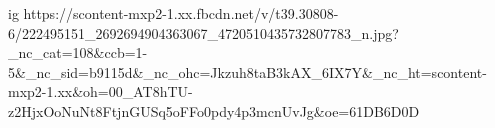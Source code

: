  
 
 
 
 

\ifcmt
  ig https://scontent-mxp2-1.xx.fbcdn.net/v/t39.30808-6/222495151_2692694904363067_4720510435732807783_n.jpg?_nc_cat=108&ccb=1-5&_nc_sid=b9115d&_nc_ohc=Jkzuh8taB3kAX_6IX7Y&_nc_ht=scontent-mxp2-1.xx&oh=00_AT8hTU-z2HjxOoNuNt8FtjnGUSq5oFFo0pdy4p3mcnUvJg&oe=61DB6D0D
\fi
